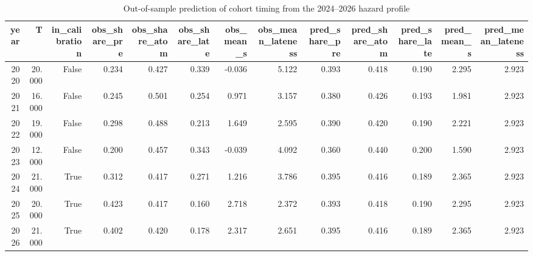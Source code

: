\begin{table}
\caption{Out-of-sample prediction of cohort timing from the 2024–2026 hazard profile}
\label{tab:validation}
\begin{tabular}{rrrrrrrrrrrrr}
\toprule
year & T & in\_calibration & obs\_share\_pre & obs\_share\_atom & obs\_share\_late & obs\_mean\_s & obs\_mean\_lateness & pred\_share\_pre & pred\_share\_atom & pred\_share\_late & pred\_mean\_s & pred\_mean\_lateness \\
\midrule
2020 & 20.000 & False & 0.234 & 0.427 & 0.339 & -0.036 & 5.122 & 0.393 & 0.418 & 0.190 & 2.295 & 2.923 \\
2021 & 16.000 & False & 0.245 & 0.501 & 0.254 & 0.971 & 3.157 & 0.380 & 0.426 & 0.193 & 1.981 & 2.923 \\
2022 & 19.000 & False & 0.298 & 0.488 & 0.213 & 1.649 & 2.595 & 0.390 & 0.420 & 0.190 & 2.221 & 2.923 \\
2023 & 12.000 & False & 0.200 & 0.457 & 0.343 & -0.039 & 4.092 & 0.360 & 0.440 & 0.200 & 1.590 & 2.923 \\
2024 & 21.000 & True & 0.312 & 0.417 & 0.271 & 1.216 & 3.786 & 0.395 & 0.416 & 0.189 & 2.365 & 2.923 \\
2025 & 20.000 & True & 0.423 & 0.417 & 0.160 & 2.718 & 2.372 & 0.393 & 0.418 & 0.190 & 2.295 & 2.923 \\
2026 & 21.000 & True & 0.402 & 0.420 & 0.178 & 2.317 & 2.651 & 0.395 & 0.416 & 0.189 & 2.365 & 2.923 \\
\bottomrule
\end{tabular}
\end{table}
